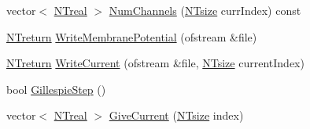 \begin{DoxyCompactItemize}
vector$<$ \hyperlink{nt__types_8h_a814a97893e9deb1eedcc7604529ba80d}{NTreal} $>$ \hyperlink{class_n_t_b_p__membrane__compartment__sequence__o_a3416ddde9b57de73311c9ffbb027d200}{NumChannels} (\hyperlink{nt__types_8h_a06c124f2e4469769b58230253ce0560b}{NTsize} currIndex) const 
\item 
\hyperlink{nt__types_8h_ab9564ee8f091e809d21b8451c6683c53}{NTreturn} \hyperlink{class_n_t_b_p__membrane__compartment__sequence__o_a6823569046250af16c9527a5642e1fb9}{WriteMembranePotential} (ofstream \&file)
\item 
\hyperlink{nt__types_8h_ab9564ee8f091e809d21b8451c6683c53}{NTreturn} \hyperlink{class_n_t_b_p__membrane__compartment__sequence__o_a057880d9658a00a18ac54d4249411dff}{WriteCurrent} (ofstream \&file, \hyperlink{nt__types_8h_a06c124f2e4469769b58230253ce0560b}{NTsize} currentIndex)
\item 
bool \hyperlink{class_n_t_b_p__membrane__compartment__sequence__o_aec1660adef2dd64d481993fcd61cac40}{GillespieStep} ()
\item 
vector$<$ \hyperlink{nt__types_8h_a814a97893e9deb1eedcc7604529ba80d}{NTreal} $>$ \hyperlink{class_n_t_b_p__membrane__compartment__sequence__o_a9198720e6722b71bb3502f79a4c17064}{GiveCurrent} (\hyperlink{nt__types_8h_a06c124f2e4469769b58230253ce0560b}{NTsize} index)
\end{DoxyCompactItemize}
